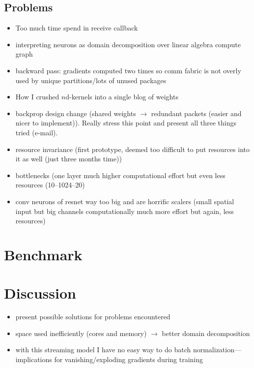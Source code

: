 \documentclass[]{article}
\begin{document}


\subsection{Problems} %
\label{subsec:problems}

\begin{itemize}
  \item Too much time spend in receive callback
  \item interpreting neurons as domain decomposition over linear algebra
    compute graph
  \item backward pass: gradients computed two times so comm fabric is
    not overly used by unique partitions/lots of unused packages
  \item How I crushed $n$d-kernels into a single blog of weights
  \item backprop design change (shared weights $\rightarrow$ redundant
    packets (easier and nicer to implement)).
    Really stress this point and present all three things tried
    (e-mail).
  \item resource invariance (first prototype, deemed too difficult
    to put resources into it as well (just three months time))
  \item bottlenecks (one layer much higher
    computational effort but even less resources (10--1024--20)
  \item conv neurons of resnet way too big and are horrific scalers
    (small spatial input but big channels computationally much more
    effort but again, less resources)
\end{itemize}




\section{Benchmark}
\label{sec:benchmark}

\section{Discussion}
\label{sec:discussion}

\begin{itemize}
  \item present possible solutions for problems encountered
  \item space used inefficiently (cores and memory) $\rightarrow$ better
    domain decomposition
  \item with this streaming model I have no easy way to do batch
    normalization---implications for vanishing/exploding gradients
    during training
\end{itemize}
\end{document}
